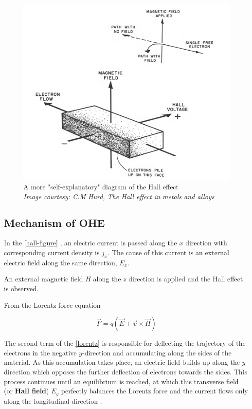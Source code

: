 \begin{figure}[h!]
    \includegraphics[width=\columnwidth]{hall-effect-hurd.png}
    \caption{A more "self-explanatory" diagram of the Hall effect\\ \textit{Image courtesy: C.M Hurd, The Hall effect in metals and alloys}}
\end{figure}

\subsection{Mechanism of OHE}

In the \cref{hall-figure} , an electric current is passed along the $ x $ direction with corresponding current density is $ j_x $.
The cause of this current is an external electric field along the same direction, $ E_x $.

An external magnetic field $ H $ along the $ z $ direction is applied and the Hall effect is observed.

From the Lorentz force equation

\begin{equation} \label{lorentz}
    \vec{F} = q (\vec{E} + \vec{v} \times \vec{H})
\end{equation}

The second term of the \cref{lorentz} is responsible for deflecting the trajectory of the electrons in the negative $ y $-direction and accumulating along the sides of the material.
As this accumulation takes place, an electric field builds up along the $ y $-direction which opposes the further deflection of electrons towards the sides.
This process continues until an equilibrium is reached, at which this transverse field (or \textbf{Hall field}) $ E_y $ perfectly balances the Lorentz force and the current flows only along the longitudinal direction \cite{ashcroft1976solid}.

